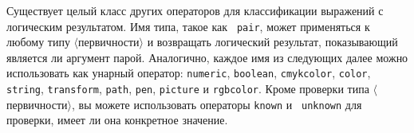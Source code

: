 \documentclass{article} %
\newcommand\invisgap{\nobreak\hskip0pt\relax}
\newcommand\tdescr[1]{$\langle$\invisgap#1\invisgap$\rangle$}
\begin{document}
Существует целый класс других операторов для классификации выражений с 
логическим результатом.
Имя типа, такое как {\tt
pair}, может применяться к любому типу 
\tdescr{первичности} и возвращать логический результат, показывающий 
является ли аргумент парой\label{Dpairop}. 
Аналогично, каждое имя из следующих далее можно использовать как унарный 
оператор: 
{\tt numeric}\label{Dnumop}, 
{\tt boolean}\label{Dboolop}, 
{\tt cmykcolor}\label{Dccolrop}, 
{\tt color}\label{Dcolrop}, 
{\tt string}\label{Dstrgop}, 
{\tt transform}\label{Dtrnfop}, 
{\tt path}\label{Dpathop}, 
{\tt pen}\label{Dpenop}, 
{\tt picture}\label{Dpictop} и 
{\tt rgbcolor}\label{Drcolrop}.
Кроме проверки типа \tdescr{первичности}, вы можете использовать операторы 
{\tt known}\label{Dknown} и {\tt
unknown}\label{Dunknwn} для проверки, 
имеет ли она конкретное значение.
\end{document}
